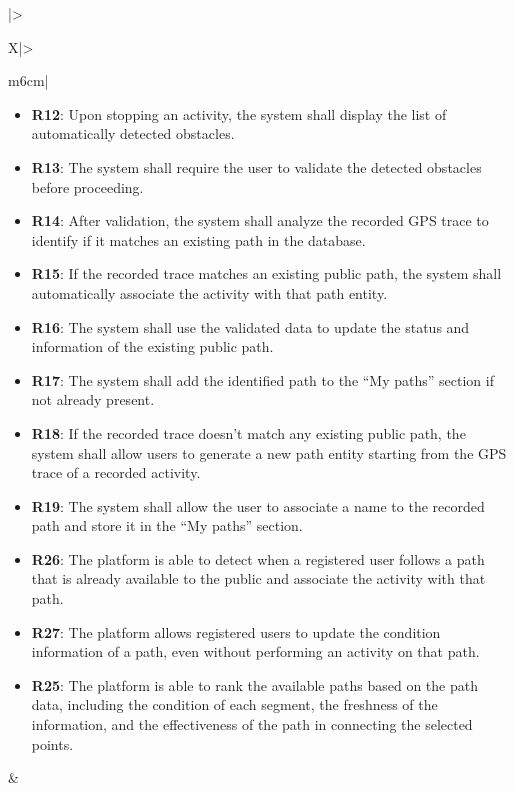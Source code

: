 \begin{table}[H]
\begin{tabularx}{\textwidth}{|>{\raggedright\arraybackslash}X|>{\raggedright\arraybackslash}m{6cm}|}
        \begin{minipage}[t]{\linewidth}
        \begin{itemize}[leftmargin=*, nosep, label={}]
            \item \textbf{R12}: Upon stopping an activity, the system shall display the list of automatically detected obstacles.
            \item \textbf{R13}: The system shall require the user to validate the detected obstacles before proceeding.
            \item \textbf{R14}: After validation, the system shall analyze the recorded GPS trace to identify if it matches an existing path in the database.
            \item \textbf{R15}: If the recorded trace matches an existing public path, the system shall automatically associate the activity with that path entity.
            \item \textbf{R16}: The system shall use the validated data to update the status and information of the existing public path.
            \item \textbf{R17}: The system shall add the identified path to the “My paths” section if not already present.
            \item \textbf{R18}: If the recorded trace doesn't match any existing public path, the system shall allow users to generate a new path entity starting from the GPS trace of a recorded activity.
            \item \textbf{R19}: The system shall allow the user to associate a name to the recorded path and store it in the “My paths” section.
            \item \textbf{R26}: The platform is able to detect when a registered user follows a path that is already available to the public and associate the activity with that path.
            \item \textbf{R27}: The platform allows registered users to update the condition information of a path, even without performing an activity on that path.
            \item \textbf{R25}: The platform is able to rank the available paths based on the path data, including the condition of each segment, the freshness of the information, and the effectiveness of the path in connecting the selected points.
        \end{itemize}
        \end{minipage}
        &
        \begin{minipage}[t]{\linewidth}

\end{minipage}
\end{tabularx}
\end{table}
